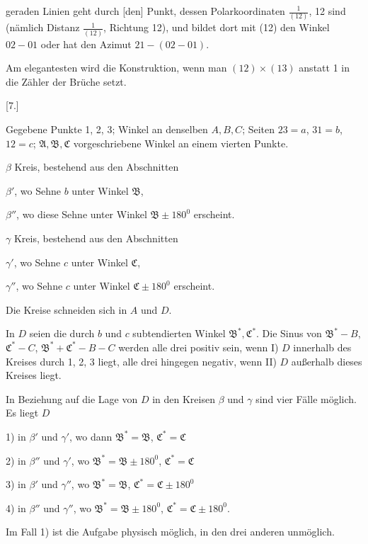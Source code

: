 %
geraden Linien geht durch [den] Punkt, dessen Polarkoordinaten $\frac{1}{(12)}$, 12 sind (nämlich Distanz $\frac{1}{(12)}$, Richtung 12), und bildet dort mit (12) den Winkel $02-01$ oder hat den Azimut $21-(02-01)$.

Am elegantesten wird die Konstruktion, wenn man $(12)\times(13)$ anstatt 1 in die Zähler der Brüche setzt.

\medskip

\begin{center}[7.]\end{center}

Gegebene Punkte 1, 2, 3; Winkel an denselben $A, B, C$; Seiten $23=a$, $31=b$, $12=c$; $\mathfrak{A}, \mathfrak{B}, \mathfrak{C}$ vorgeschriebene Winkel an einem vierten Punkte.

$\beta$ Kreis, bestehend aus den Abschnitten

$\beta'$, wo Sehne $b$ unter Winkel $\mathfrak{B}$,

$\beta''$, wo diese Sehne unter Winkel $\mathfrak{B}\pm180^0$ erscheint.

$\gamma$ Kreis, bestehend aus den Abschnitten

$\gamma'$, wo Sehne $c$ unter Winkel $\mathfrak{C}$,

$\gamma''$, wo Sehne $c$ unter Winkel $\mathfrak{C}\pm180^0$ erscheint.

Die Kreise schneiden sich in $A$ und $D$.

In $D$ seien die durch $b$ und $c$ subtendierten Winkel $\mathfrak{B}^*, \mathfrak{C}^*$. Die Sinus von $\mathfrak{B}^*-B$, $\mathfrak{C}^*-C$, $\mathfrak{B}^*+\mathfrak{C}^*-B-C$ werden alle drei positiv sein, wenn I) $D$ innerhalb des Kreises durch 1, 2, 3 liegt, alle drei hingegen negativ, wenn II) $D$ außerhalb dieses Kreises liegt.

In Beziehung auf die Lage von $D$ in den Kreisen $\beta$ und $\gamma$ sind vier Fälle möglich. Es liegt $D$

1) in $\beta'$ und $\gamma'$, wo dann $\mathfrak{B}^*=\mathfrak{B}$, $\mathfrak{C}^*=\mathfrak{C}$

2) in $\beta''$ und $\gamma'$, wo $\mathfrak{B}^*=\mathfrak{B}\pm180^0$, $\mathfrak{C}^*=\mathfrak{C}$

3) in $\beta'$ und $\gamma''$, wo $\mathfrak{B}^*=\mathfrak{B}$, $\mathfrak{C}^*=\mathfrak{C}\pm180^0$

4) in $\beta''$ und $\gamma''$, wo $\mathfrak{B}^*=\mathfrak{B}\pm180^0$, $\mathfrak{C}^*=\mathfrak{C}\pm180^0$.

Im Fall 1) ist die Aufgabe physisch möglich, in den drei anderen unmöglich.
